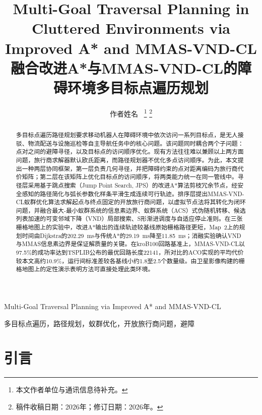 \documentclass[lettersize,journal]{IEEEtran}
\begin{document}
\title{Multi-Goal Traversal Planning in Cluttered Environments via Improved A* and MMAS-VND-CL\\
{\normalsize 融合改进A*与MMAS-VND-CL的障碍环境多目标点遍历规划}}

\author{作者姓名~%
\thanks{本文作者单位与通讯信息待补充。}%
\thanks{稿件收稿日期：2026年；修订日期：2026年。}}

%
{Multi-Goal Traversal Planning via Improved A* and MMAS-VND-CL}

\maketitle

\begin{abstract}

多目标点遍历路径规划要求移动机器人在障碍环境中依次访问一系列目标点，是无人接驳、物流配送与设施巡检等自主导航任务中的核心问题。该问题同时耦合两个子问题：点对之间的避障寻径，以及目标点的访问顺序优化。现有方法往往难以兼顾以上两方面问题，旅行商求解器默认欧氏距离，而路径规划器不优化多点访问顺序。为此，本文提出一种两层协同框架，第一层负责几何寻径，并把障碍约束的点对距离编码为旅行商代价矩阵；第二层在该矩阵上优化目标点的访问顺序，将两类能力统一在同一管线中。寻径层采用基于跳点搜索（Jump Point Search, JPS）的改进A*算法剪枝冗余节点，经安全感知的路径简化与弧长参数化样条平滑生成连续可行轨迹。排序层提出MMAS-VND-CL蚁群优化算法求解起点与终点固定的开放旅行商问题，以虚拟节点法将其转化为闭环问题，并融合最大-最小蚁群系统的信息素边界、蚁群系统（ACS）式伪随机转移、候选列表加速的可变邻域下降（VND）局部搜索、S形渐进调度与自适应停止准则。在三张栅格地图上的实验中，改进A*输出的连续轨迹较基线原始栅格路径更短，Map~2上的规划时间由Dijkstra的202.29~ms与传统A*的29.19~ms降至11.85~ms；消融实验确认VND与MMAS信息素边界是保证解质量的关键。在kroB100回路基准上，MMAS-VND-CL以97.5\%的成功率达到TSPLIB公布的最优回路长度22141，所对比的ACO实现的平均代价较本文高约10.9\%，运行间标准差较各基线小约1.8至2.5个数量级。由卫星影像构建的栅格地图上的定性演示表明方法可直接处理此类环境。

\end{abstract}

\begin{IEEEkeywords}

多目标点遍历，路径规划，蚁群优化，开放旅行商问题，避障

\end{IEEEkeywords}

\section{引言}
\end{document}
